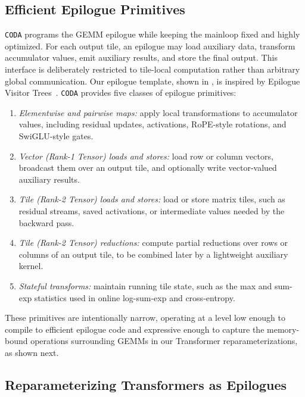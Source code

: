 \subsection{Efficient Epilogue Primitives}
\label{sec:epilogue-primitives}

\texttt{CODA} programs the GEMM epilogue while keeping the mainloop fixed and highly optimized. For each output tile, an epilogue may load auxiliary data, transform accumulator values, emit auxiliary results, and store the final output. This interface is deliberately restricted to tile-local computation rather than arbitrary global communication. Our epilogue template, shown in , is inspired by Epilogue Visitor Trees~\cite{chen2024evt}.
\texttt{CODA} provides five classes of epilogue primitives:
\begin{enumerate}[leftmargin=*,nosep,nolistsep,noitemsep]
    \item \emph{Elementwise and pairwise maps:} apply local transformations to accumulator values, including residual updates, activations, RoPE-style rotations, and SwiGLU-style gates.
    \item \emph{Vector (Rank-1 Tensor) loads and stores:} load row or column vectors, broadcast them over an output tile, and optionally write vector-valued auxiliary results.
    \item \emph{Tile (Rank-2 Tensor) loads and stores:} load or store matrix tiles, such as residual streams, saved activations, or intermediate values needed by the backward pass.
    \item \emph{Tile (Rank-2 Tensor) reductions:} compute partial reductions over rows or columns of an output tile, to be combined later by a lightweight auxiliary kernel.
    \item \emph{Stateful transforms:} maintain running tile state, such as the max and sum-exp statistics used in online log-sum-exp and cross-entropy.
\end{enumerate}



These primitives are intentionally narrow, operating at a level low enough to compile to efficient epilogue code and expressive enough to capture the memory-bound operations surrounding GEMMs in our Transformer reparameterizations, as shown next.



\subsection{Reparameterizing Transformers as Epilogues}
\label{sec:reparameterization}

